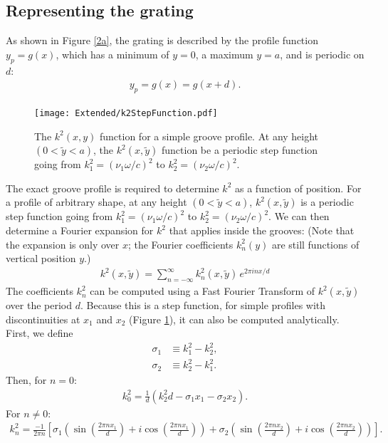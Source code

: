 \subsection{Representing the grating}

As shown in Figure \ref{2a}, the grating is described by the profile function $y_p = g(x)$, which has a minimum of $y=0$, a maximum $y=a$, and is periodic on $d$:
\begin{align}
y_p = g(x) = g(x+d).
\end{align}
\label{k2Expansion}

\begin{figure}[htbp] %
   \centering
   \texttt{[image: Extended/k2StepFunction.pdf]} 
   \caption[The $k^2(x, y)$ function for a simple groove profile.]{The $k^2(x, y)$ function for a simple groove profile. At any height $(0<\tilde y<a)$, the $k^2(x, \tilde y)$ function be a periodic step function going from $k^2_1=(\nu_1 \omega/c)^2$ to $k^2_2 = (\nu_2 \omega/c)^2$. }
   \label{k2StepFn}
\end{figure}

The exact groove profile is required to determine $k^2$ as a function of position. For a profile of arbitrary shape, at any height $(0<\tilde y<a)$, $k^2(x, \tilde y)$ is a periodic step function going from $k^2_1=(\nu_1 \omega/c)^2$ to $k^2_2 = (\nu_2 \omega/c)^2$.  We can then determine a Fourier expansion for $k^2$ that applies inside the grooves:  (Note that the expansion is only over $x$; the Fourier coefficients $k^2_n(y)$ are still functions of vertical position $y$.)
\begin{align}
\label{k2FourierExpansion}
k^2(x,\tilde y) = \sum \limits_{n=-\infty}^{\infty} k^2_n(x, \tilde y)\, e^{2\pi i n x/d}
\end{align}
The coefficients $k^2_n$ can be computed using a Fast Fourier Transform of $k^2(x,\tilde y)$ over the period $d$.  Because this is a step function, for simple profiles with discontinuities at $x_1$ and $x_2$ (Figure \ref{k2StepFn}), it can also be computed analytically. First, we define
\begin{align}
\sigma_1 &\equiv  k_1^2 - k_2^2, \\
\sigma_2 &\equiv k_2^2 - k_1^2.
\end{align}
Then, for $n=0$:
\begin{align}
k^2_0 = \frac{1}{d} \left( k_2^2d - \sigma_1 x_1 - \sigma_2 x_2 \right).
\end{align}
For $n\neq0$:
\begin{align}
k^2_n= \frac{-1}{2 \pi n} \left[ \sigma_1 \left( \sin \left(\frac{2\pi n x_1}{d}\right) + i \cos \left(\frac{2\pi n x_1}{d}\right) \right) +  \sigma_2 \left( \sin \left(\frac{2\pi n x_2}{d}\right) + i \cos \left(\frac{2\pi n x_2}{d}\right) \right) \right].
\end{align}

